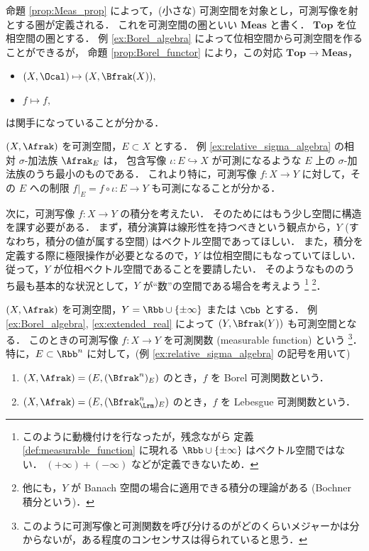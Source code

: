 \begin{remark}
    命題 \ref{prop:Meas_prop} によって，(小さな) 可測空間を対象とし，可測写像を射とする圏が定義される．
    これを可測空間の圏といい $\mathbf{Meas}$ と書く．
    $\mathbf{Top}$ を位相空間の圏とする．
    例 \ref{ex:Borel_algebra} によって位相空間から可測空間を作ることができるが，
    命題 \ref{prop:Borel_functor} により，この対応 $\mathbf{Top}\to\mathbf{Meas}$，
    \begin{itemize}
        \item $(X,\Ocal)\mapsto(X,\Bfrak(X)),$
        \item $f\mapsto f,$
    \end{itemize}
    は関手になっていることが分かる．
\end{remark}

\begin{example}
   $(X,\Afrak)$ を可測空間，$E\subset X$ とする．
   例 \ref{ex:relative_sigma_algebra} の相対 $\sigma$-加法族 $\Afrak_E$ は，
   包含写像 $\iota:E\hookrightarrow X$ が可測になるような $E$ 上の $\sigma$-加法族のうち最小のものである．
   これより特に，可測写像 $f:X\to Y$ に対して，その $E$ への制限 $f\vert_E=f\circ\iota:E\to Y$ も可測になることが分かる．
\end{example}

次に，可測写像 $f:X\to Y$ の積分を考えたい．
そのためにはもう少し空間に構造を課す必要がある．
まず，積分演算は線形性を持つべきという観点から，$Y$ (すなわち，積分の値が属する空間) はベクトル空間であってほしい．
また，積分を定義する際に極限操作が必要となるので，$Y$ は位相空間にもなっていてほしい．
従って，$Y$ が位相ベクトル空間であることを要請したい．
そのようなもののうち最も基本的な状況として，$Y$ が``数''の空間である場合を考えよう
\footnote{このように動機付けを行なったが，残念ながら
定義 \ref{def:measurable_function} に現れる $\Rbb\cup\{\pm\infty\}$ はベクトル空間ではない．
$(+\infty)+(-\infty)$ などが定義できないため．}
\footnote{他にも，$Y$ が Banach 空間の場合に適用できる積分の理論がある (Bochner 積分という)．}．

\begin{definition}\label{def:measurable_function}
    $(X,\Afrak)$ を可測空間，$Y=\Rbb\cup\{\pm\infty\} $ または $\Cbb$ とする．
    例 \ref{ex:Borel_algebra}, \ref{ex:extended_real} によって $(Y,\Bfrak(Y))$ も可測空間となる．
    このときの可測写像 $f:X\to Y$ を可測関数 (measurable function) という
    \footnote{このように可測写像と可測関数を呼び分けるのがどのくらいメジャーかは分からないが，ある程度のコンセンサスは得られていると思う\cite{ms95741}．}．
    特に，$E\subset\Rbb^n$ に対して，(例 \ref{ex:relative_sigma_algebra} の記号を用いて)
    \begin{enumerate}
        \item $(X,\Afrak)=(E,(\Bfrak^n)_E)$ のとき，$f$ を Borel 可測関数という．
        \item $(X,\Afrak)=(E,(\Bfrak_\Lrm^n)_E)$ のとき，$f$ を Lebesgue 可測関数という．
    \end{enumerate}
\end{definition}

